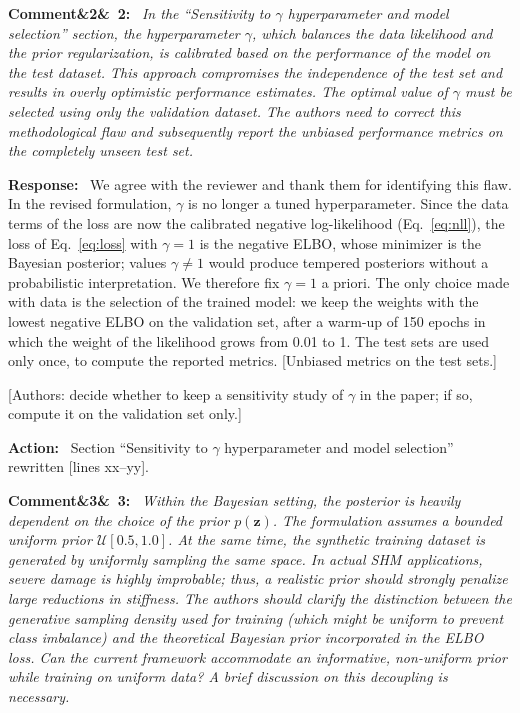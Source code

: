 \documentclass[11pt]{article}
\newenvironment{rcomment}[1]{\par\bigskip\noindent\textbf{Comment\ifx&#1&\else\ #1\fi:}\ \itshape}{\par}
\newenvironment{response}{\par\smallskip\noindent\color{resp}\textbf{Response:}\ }{\par}
\newenvironment{action}{\par\smallskip\noindent\color{resp}\textbf{Action:}\ }{\par}
\newcommand{\authornote}[1]{\textcolor{note}{\textsf{[Authors: #1]}}}
\newcommand{\tbd}[1]{\textcolor{note}{\textsf{[#1]}}}
\newcommand{\lines}[1]{\tbd{lines #1}}
\newcommand{\z}{\mathbf{z}}
\begin{document}
\begin{rcomment}{2}
In the ``Sensitivity to $\gamma$ hyperparameter and model selection'' section, the hyperparameter $\gamma$, which
balances the data likelihood and the prior regularization, is calibrated based on the performance of the model on the
test dataset. This approach compromises the independence of the test set and results in overly optimistic performance
estimates. The optimal value of $\gamma$ must be selected using only the validation dataset. The authors need to
correct this methodological flaw and subsequently report the unbiased performance metrics on the completely unseen test
set.
\end{rcomment}

\begin{response}
We agree with the reviewer and thank them for identifying this flaw. In the revised formulation, $\gamma$ is no longer
a tuned hyperparameter. Since the data terms of the loss are now the calibrated negative log-likelihood
(Eq.~\eqref{eq:nll}), the loss of Eq.~\eqref{eq:loss} with $\gamma=1$ is the negative ELBO, whose minimizer is the
Bayesian posterior; values $\gamma\neq1$ would produce tempered posteriors without a probabilistic interpretation. We
therefore fix $\gamma=1$ a priori. The only choice made with data is the selection of the trained model: we keep the
weights with the lowest negative ELBO on the validation set, after a warm-up of 150 epochs in which the weight of the
likelihood grows from 0.01 to 1. The test sets are used only once, to compute the reported metrics.
\tbd{Unbiased metrics on the test sets.}
\end{response}
\authornote{decide whether to keep a sensitivity study of $\gamma$ in the paper; if so, compute it on the validation
set only.}

\begin{action}
Section ``Sensitivity to $\gamma$ hyperparameter and model selection'' rewritten \lines{xx--yy}.
\end{action}

\begin{rcomment}{3}
Within the Bayesian setting, the posterior is heavily dependent on the choice of the prior $p(\z)$. The formulation
assumes a bounded uniform prior $\mathcal{U}[0.5,1.0]$. At the same time, the synthetic training dataset is generated
by uniformly sampling the same space. In actual SHM applications, severe damage is highly improbable; thus, a realistic
prior should strongly penalize large reductions in stiffness. The authors should clarify the distinction between the
generative sampling density used for training (which might be uniform to prevent class imbalance) and the theoretical
Bayesian prior incorporated in the ELBO loss. Can the current framework accommodate an informative, non-uniform prior
while training on uniform data? A brief discussion on this decoupling is necessary.
\end{rcomment}
\end{document}
